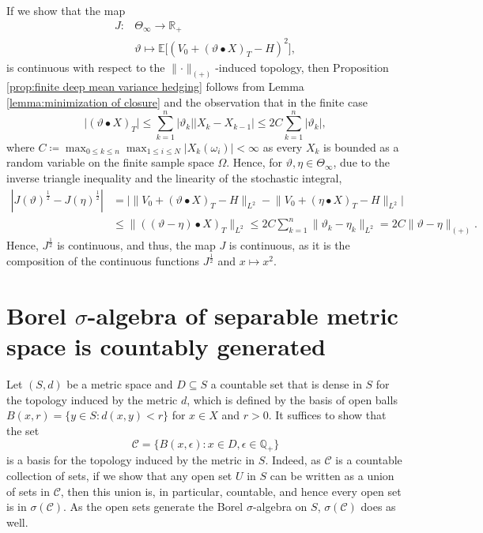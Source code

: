 \documentclass[11pt,a4paper,twoside,openany]{report}
\numberwithin{equation}{section}
\theoremstyle{plain} %
\theoremstyle{definition} %
\theoremstyle{remark} %
\begin{document}
If we show that the map 
\begin{align*}
    J:&\Theta_{\infty}\to\mathbb{R}_+
    \\&\vartheta\mapsto\mathbb{E}\Big[(V_0+(\vartheta\bullet X)_{T}-H)^2\Big],
\end{align*}
is continuous with respect to the \(\lVert\cdot\rVert_{(+)}\)-induced topology, then  
Proposition \ref{prop:finite deep mean variance hedging} follows from Lemma \ref{lemma:minimization of closure} and the observation that in the finite case 
\begin{equation*}
    \big|(\vartheta\bullet X)_T\big|\leq\sum_{k=1}^{n}|\vartheta_k||X_{k}-X_{k-1}|\leq2C\sum_{k=1}^n|\vartheta_k|,
\end{equation*}
where \(C\coloneqq\max_{0\leq k\leq n}\max_{1\leq i\leq N}|X_k(\omega_i)|<\infty\) as every \(X_k\) is bounded as a random variable on the finite sample space \(\Omega\). Hence, for \(\vartheta,\eta\in\Theta_{\infty}\), due to the inverse triangle inequality and the linearity of the stochastic integral,
\begin{align*}
    |J(\vartheta)^{\frac{1}{2}}-J(\eta)^{\frac{1}{2}}|&=\Big|\lVert V_0+(\vartheta\bullet X)_T-H\rVert_{L^2}-\lVert V_0+(\eta\bullet X)_T-H\rVert_{L^2}\Big|
    \\&\leq\lVert ((\vartheta-\eta)\bullet X)_T\rVert_{L^2}\leq 2C\sum_{k=1}^n\lVert\vartheta_k-\eta_k\rVert_{L^2}=2C\lVert\vartheta-\eta\rVert_{(+)}.
\end{align*}
Hence, \(J^{\frac{1}{2}}\) is continuous, and 
thus, the map \(J\) is continuous, as it is the composition of the continuous functions \(J^{\frac{1}{2}}\) and \(x\mapsto x^2\). 

\section{Borel \(\sigma\)-algebra of separable metric space is countably generated}\label{Appendix:Borel sigma-algebra of separable metric space is countably generated}
Let \((S,d)\) be a metric space and \(D\subseteq S\) a countable set that is dense in \(S\) for the topology induced by the metric \(d\), which is defined by the basis of open balls \(B(x,r)=\{y\in S:d(x,y)<r\}\) for \(x\in X\) and \(r>0\).
 It suffices to show that the set 
 \begin{equation*}
     \mathcal{C}=\{B(x,\epsilon):x\in D,\epsilon\in\mathbb{Q}_+\}
 \end{equation*}
is a basis for the topology induced by the metric in \(S\). Indeed, as \(\mathcal{C}\) is a countable collection of sets, if we show that any open set \(U\) in \(S\) can be written as a union of sets in \(\mathcal{C}\), then this union is, in particular, countable, and hence every open set is in \(\sigma(\mathcal{C})\). As the open sets generate the Borel \(\sigma\)-algebra on \(S\), \(\sigma(\mathcal{C})\) does as well.
\end{document}
